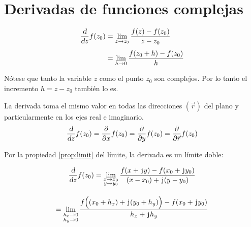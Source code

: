 \chapter{Derivadas de funciones complejas}

\begin{mdframed}[style=DefinitionFrame]
    \begin{defn}
    \end{defn}
    \begin{align*}
        \frac{\textsl{d}}{\textsl{d} z} f(z_0) &= \lim_{z \to z_0} \frac{f(z) - f(z_0)}{z - z_0}
        \\[1ex]
        &= \lim_{h \to 0} \frac{f(z_0+h) - f(z_0)}{h}
    \end{align*}
\end{mdframed}

Nótese que tanto la variable $z$ como el punto $z_0$ son complejos.
Por lo tanto el incremento $h=z-z_0$ también lo es.

\begin{center}
    \def\svgwidth{0.6\linewidth}
    
\end{center}

\begin{mdframed}[style=PropertyFrame]
    \begin{prop}
        \label{prop:partialDerivate}
    \end{prop}
    La derivada toma el mismo valor en todas las direcciones $(\Vec{r})$ del plano y particularmente en los ejes real e imaginario.
    \begin{equation*}
        \frac{\textsl{d}}{\textsl{d} z} f(z_0) = \frac{\partial}{\partial x} f(z_0) = \frac{\partial}{\partial y} f(z_0) = \frac{\partial}{\partial \Vec{r}} f(z_0)
    \end{equation*}
\end{mdframed}

Por la propiedad \ref{prop:limit} del límite, la derivada es un límite doble:

\begin{mdframed}[style=PropertyFrame]
    \begin{prop}
    \end{prop}
    \begin{gather*}
        \frac{\textsl{d}}{\textsl{d} z} f(z_0) = \lim_{\substack{x \to x_0\\y \to y_0}} \frac{f(x + \mkern2mu\mathrm{j}\mkern1mu y) - f(x_0 + \mkern2mu\mathrm{j}\mkern1mu y_0)}{(x-x_0) + \mkern2mu\mathrm{j}\mkern1mu (y-y_0)}
        \\[1em]
        = \lim_{\substack{h_x \to 0\\h_y \to 0}}\frac{f \Big( (x_0+h_x) + \mkern2mu\mathrm{j}\mkern1mu (y_0+h_y) \Big) - f(x_0 + \mkern2mu\mathrm{j}\mkern1mu y_0)}{h_x + \mkern2mu\mathrm{j}\mkern1mu h_y}
    \end{gather*}
\end{mdframed}


